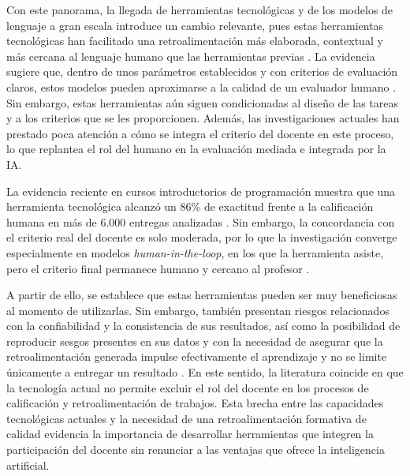 \documentclass[letterpaper, 10 pt, conference]{ieeeconf}
\begin{document}
Con este panorama, la llegada de herramientas tecnológicas y de los modelos de lenguaje a gran escala introduce un cambio relevante, pues estas herramientas tecnológicas han facilitado una retroalimentación más elaborada, contextual y más cercana al lenguaje humano que las herramientas previas \cite{12}. La evidencia sugiere que, dentro de unos parámetros establecidos y con criterios de evaluación claros, estos modelos pueden aproximarse a la calidad de un evaluador humano \cite{12}. Sin embargo, estas herramientas aún siguen condicionadas al diseño de las tareas y a los criterios que se les proporcionen. Además, las investigaciones actuales han prestado poca atención a cómo se integra el criterio del docente en este proceso, lo que replantea el rol del humano en la evaluación mediada e integrada por la IA. 

La evidencia reciente en cursos introductorios de programación muestra que una herramienta tecnológica alcanzó un 86\% de exactitud frente a la calificación humana en más de 6.000 entregas analizadas \cite{23}. Sin embargo, la concordancia con el criterio real del docente es solo moderada, por lo que la investigación converge especialmente en modelos \textit{human-in-the-loop}, en los que la herramienta asiste, pero el criterio final permanece humano y cercano al profesor \cite{8}\cite{21}. 

A partir de ello, se establece que estas herramientas pueden ser muy beneficiosas al momento de utilizarlas. Sin embargo, también presentan riesgos relacionados con la confiabilidad y la consistencia de sus resultados, así como la posibilidad de reproducir sesgos presentes en sus datos y con la necesidad de asegurar que la retroalimentación generada impulse efectivamente el aprendizaje y no se limite únicamente a entregar un resultado \cite{13}. En este sentido, la literatura coincide en que la tecnología actual no permite excluir el rol del docente en los procesos de calificación y retroalimentación de trabajos. Esta brecha entre las capacidades tecnológicas actuales y la necesidad de una retroalimentación formativa de calidad evidencia la importancia de desarrollar herramientas que integren la participación del docente sin renunciar a las ventajas que ofrece la inteligencia artificial.
\end{document}
